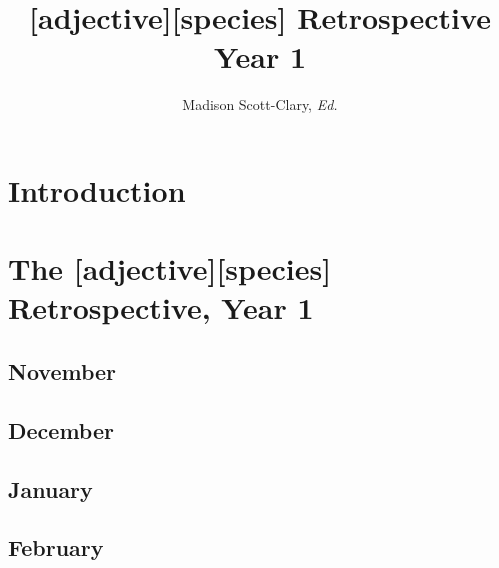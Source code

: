 \documentclass[12pt,letterpaper,oneside]{memoir}
\begin{document}
  \title{[adjective][species] Retrospective Year 1}
  \author{Madison Scott-Clary, \textit{Ed.}}
  \maketitle
  \newpage

  \tableofcontents

  \part{Introduction}
  

  \part{The [adjective][species] Retrospective, Year 1}
  \chapter{November}
  
  
  
  
  
  \chapter{December}
  
  
  
  
  \chapter{January}
  
  
  
  
  
  
  \chapter{February}
  
  
  
  
  
  
  
\end{document}

